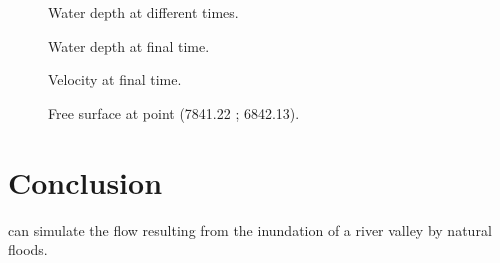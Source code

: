 \begin{figure}[H]
\begin{minipage}[t]{0.5\textwidth}
 \centering
\end{minipage}
\begin{minipage}[t]{0.5\textwidth}
 \centering
\end{minipage}
\begin{minipage}[t]{0.5\textwidth}
 \centering
\end{minipage}
\begin{minipage}[t]{0.5\textwidth}
 \centering
\end{minipage}
\caption{Water depth at different times.}
\label{fig:culm:WaterDepths}
\end{figure}

\begin{figure}[H]
 \centering
  \caption{Water depth at final time.}\label{fig:culm:WaterDepth}
\end{figure}

\begin{figure}[H]
 \centering
  \caption{Velocity at final time.}\label{fig:culm:Velocity}
\end{figure}

\begin{figure}[H]
 \centering
  \caption{Free surface at point (7841.22 ; 6842.13).}\label{fig:culm:timeserie}
\end{figure}

\section{Conclusion}
 can simulate the flow resulting from the inundation of a river valley by natural floods.
